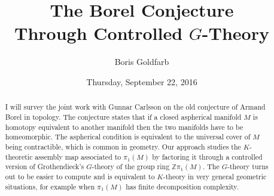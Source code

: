 \documentclass{UAmathtalk}
\author{Boris Goldfarb}
\title{The Borel Conjecture\\ Through Controlled $G$-Theory}
\date{Thursday, September 22, 2016}
\begin{document}
\maketitle

\begin{abstract}
I will survey the joint work with Gunnar Carlsson on the old conjecture of Armand Borel in topology.  The conjecture states that if a closed aspherical manifold $M$ is homotopy equivalent to another manifold then the two manifolds have to be homeomorphic.  The aspherical condition is equivalent to the universal cover of $M$ being contractible, which is common in geometry.  Our approach studies the $K$-theoretic assembly map associated to $\pi_1 (M)$ by factoring it through a controlled version of Grothendieck's $G$-theory of the group ring $\mathbb{Z} \pi_1 (M)$.  The $G$-theory turns out to be easier to compute and is equivalent to $K$-theory in very general geometric situations, for example when $\pi_1 (M)$ has finite decomposition complexity.
\end{abstract}
\end{document}
